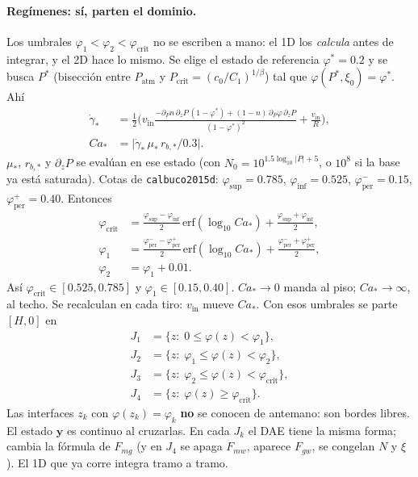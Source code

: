 \documentclass[11pt,a4paper]{article}
\begin{document}
\paragraph{Regímenes: sí, parten el dominio.}
Los umbrales $\varphi_1<\varphi_2<\varphi_{\mathrm{crit}}$
no se escriben a mano: el 1D los
\emph{calcula} antes de integrar, y el 2D hace lo mismo.
Se elige el estado de referencia $\varphi^\ast=0.2$ y se
busca $P^\ast$ (bisección entre $P_{\mathrm{atm}}$ y
$P_{\mathrm{crit}}=(c_0/C_1)^{1/\beta}$) tal que
$\varphi(P^\ast,\xi_0)=\varphi^\ast$. Ahí
\begin{equation}
\label{eq:Ca-ast}
\begin{aligned}
\dot\gamma_\ast
&=\frac12\Biggl(
v_{\mathrm{in}}
\frac{
-\partial_P n\,\partial_z P\,(1-\varphi^\ast)
+(1-n)\,\partial_P\varphi\,\partial_z P
}{(1-\varphi^\ast)^2}
+\frac{v_{\mathrm{in}}}{R}
\Biggr),
\\
Ca_\ast
&=\bigl\lvert\dot\gamma_\ast\,\mu_\ast\,r_{b,\ast}/0.3\bigr\rvert.
\end{aligned}
\end{equation}
$\mu_\ast$, $r_{b,\ast}$ y $\partial_z P$ se evalúan en ese
estado (con $N_0=10^{1.5\log_{10}\lvert\dot P\rvert+5}$, o
$10^8$ si la base ya está saturada). Cotas de
\texttt{calbuco2015d}:
$\varphi_{\mathrm{sup}}=0.785$,
$\varphi_{\mathrm{inf}}=0.525$,
$\varphi_{\mathrm{per}}^-=0.15$,
$\varphi_{\mathrm{per}}^+=0.40$. Entonces
\begin{equation}
\label{eq:umbrales-Ca}
\begin{aligned}
\varphi_{\mathrm{crit}}
&=\frac{\varphi_{\mathrm{sup}}-\varphi_{\mathrm{inf}}}{2}\,
\mathrm{erf}(\log_{10}Ca_\ast)
+\frac{\varphi_{\mathrm{sup}}+\varphi_{\mathrm{inf}}}{2},
\\
\varphi_1
&=\frac{\varphi_{\mathrm{per}}^--\varphi_{\mathrm{per}}^+}{2}\,
\mathrm{erf}(\log_{10}Ca_\ast)
+\frac{\varphi_{\mathrm{per}}^-+\varphi_{\mathrm{per}}^+}{2},
\\
\varphi_2
&=\varphi_1+0.01.
\end{aligned}
\end{equation}
Así $\varphi_{\mathrm{crit}}\in[0.525,0.785]$ y
$\varphi_1\in[0.15,0.40]$.
$Ca_\ast\to0$ manda al piso;
$Ca_\ast\to\infty$, al techo.
Se recalculan en cada tiro: $v_{\mathrm{in}}$ mueve $Ca_\ast$.
Con esos umbrales se parte $[H,0]$ en
\begin{equation}
\label{eq:tramos}
\begin{aligned}
J_1&=\{z:\;0\le\varphi(z)<\varphi_1\},\\
J_2&=\{z:\;\varphi_1\le\varphi(z)<\varphi_2\},\\
J_3&=\{z:\;\varphi_2\le\varphi(z)<\varphi_{\mathrm{crit}}\},\\
J_4&=\{z:\;\varphi(z)\ge\varphi_{\mathrm{crit}}\}.
\end{aligned}
\end{equation}
Las interfaces $z_k$ con $\varphi(z_k)=\varphi_k$ \textbf{no}
se conocen de antemano: son bordes libres. El estado
$\mathbf{y}$ es continuo al cruzarlas. En cada $J_k$ el DAE
tiene la misma forma; cambia la fórmula de $F_{mg}$ (y en
$J_4$ se apaga $F_{mw}$, aparece $F_{gw}$, se congelan $N$ y
$\xi$). El 1D que ya corre integra tramo a tramo.
\end{document}
